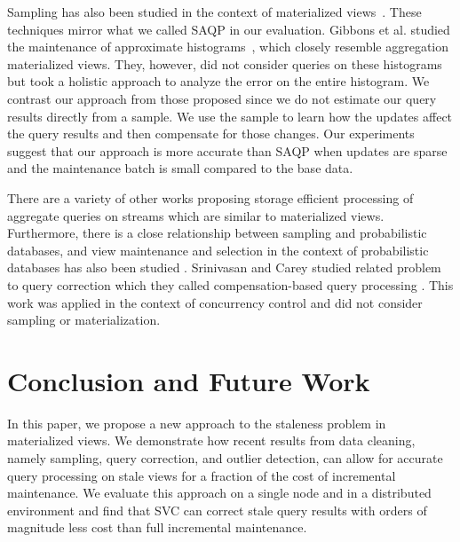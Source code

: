 Sampling has also been studied in the context of materialized views~\cite{joshi2008materialized,DBLP:conf/icde/OlkenR92}.
These techniques mirror what we called SAQP in our evaluation.
Gibbons et al. studied the maintenance of approximate histograms~\cite{gibbons1997fast}, which closely resemble aggregation materialized views.
They, however, did not consider queries on these histograms but took a holistic approach to analyze the error on the entire histogram.
We contrast our approach from those proposed since we do not estimate our query results directly from a sample.
We use the sample to learn how the updates affect the query results and then compensate for those changes.
Our experiments suggest that our approach is more accurate than SAQP when updates are sparse and the maintenance batch is small compared to the base data.

There are a variety of other works proposing storage efficient processing of aggregate queries on streams \cite{dobra2002processing, greenwald2001space} which are similar to materialized views. Furthermore, there is a close relationship between sampling and probabilistic databases, and view maintenance and selection in the context of probabilistic databases has also been studied \cite{re2007materialized}.
Srinivasan and Carey studied related problem to query correction which they called compensation-based query processing \cite{srinivasanC92}.
This work was applied in the context of concurrency control and did not consider sampling or materialization.

\vspace{-.5em}
\section{Conclusion and Future Work}\label{conclusion}
\vspace{-.25em}

In this paper, we propose a new approach to the staleness problem in materialized views.
We demonstrate how recent results from data cleaning, namely sampling, query correction, and outlier detection, can
allow for accurate query processing on stale views for a fraction of the cost of incremental maintenance. 
We evaluate this approach on a single node and in a distributed environment and find that SVC can correct stale query results 
with orders of magnitude less cost than full incremental maintenance.

